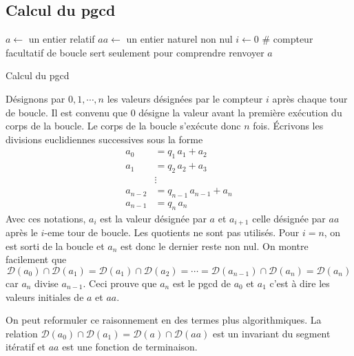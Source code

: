 \subsection{Calcul du pgcd}
\begin{algorithm}
 $a\leftarrow$ un entier relatif\;
 $aa\leftarrow$ un entier naturel non nul\;
 $i\leftarrow 0$  \# compteur facultatif de boucle sert seulement pour comprendre\;
 renvoyer $a$\;
 \caption{Calcul du pgcd}
 \label{C5546_2}
\end{algorithm}
Désignons par $0,1,\cdots, n$ les valeurs désignées par le compteur $i$ après chaque tour de boucle. Il est convenu que $0$ désigne la valeur avant la première exécution du corps de la boucle. Le corps de la boucle s'exécute donc $n$ fois. \'Ecrivons les divisions euclidiennes successives sous la forme
\begin{align*}
 a_0 &= q_1\,a_1 + a_2 \\
a_1 &= q_2\,a_2 + a_3 \\
   &\vdots \\
a_{n-2} &= q_{n-1}\,a_{n-1} +a_n\\
a_{n-1} &= q_n \, a_n
\end{align*}
Avec ces notations, $a_i$ est la valeur désignée par $a$ et $a_{i+1}$ celle désignée par $aa$ après le $i$-eme tour de boucle. Les quotients ne sont pas utilisés. Pour $i=n$, on est sorti de la boucle et $a_n$ est donc le dernier reste non nul. \newline
On montre facilement que 
\begin{displaymath}
 \mathcal D (a_0)\cap \mathcal D (a_1) = \mathcal D (a_1)\cap \mathcal D (a_2) = \cdots = \mathcal D (a_{n-1})\cap \mathcal D (a_n) = \mathcal D (a_n) 
\end{displaymath}
car $a_n$ divise $a_{n-1}$. Ceci prouve que $a_n$ est le pgcd de $a_0$ et $a_1$ c'est à dire les valeurs initiales de $a$ et $aa$.

On peut reformuler ce raisonnement en des termes plus algorithmiques. La relation $\mathcal{D}(a_0)\cap \mathcal{D}(a_1) = \mathcal{D}(a)\cap \mathcal{D}(aa)$ est un invariant du segment itératif et $aa$ est une fonction de terminaison.


